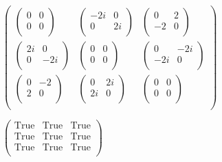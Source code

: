 \documentclass{article}
\begin{document}
\begin{doublespace}
\noindent\(\left(
\begin{array}{ccc}
 \left(
\begin{array}{cc}
 0 & 0 \\
 0 & 0 \\
\end{array}
\right) & \left(
\begin{array}{cc}
 -2 i & 0 \\
 0 & 2 i \\
\end{array}
\right) & \left(
\begin{array}{cc}
 0 & 2 \\
 -2 & 0 \\
\end{array}
\right) \\
 \left(
\begin{array}{cc}
 2 i & 0 \\
 0 & -2 i \\
\end{array}
\right) & \left(
\begin{array}{cc}
 0 & 0 \\
 0 & 0 \\
\end{array}
\right) & \left(
\begin{array}{cc}
 0 & -2 i \\
 -2 i & 0 \\
\end{array}
\right) \\
 \left(
\begin{array}{cc}
 0 & -2 \\
 2 & 0 \\
\end{array}
\right) & \left(
\begin{array}{cc}
 0 & 2 i \\
 2 i & 0 \\
\end{array}
\right) & \left(
\begin{array}{cc}
 0 & 0 \\
 0 & 0 \\
\end{array}
\right) \\
\end{array}
\right)\)
\end{doublespace}

\begin{doublespace}
\noindent\(\left(
\begin{array}{ccc}
 \text{True} & \text{True} & \text{True} \\
 \text{True} & \text{True} & \text{True} \\
 \text{True} & \text{True} & \text{True} \\
\end{array}
\right)\)
\end{doublespace}
\end{document}
